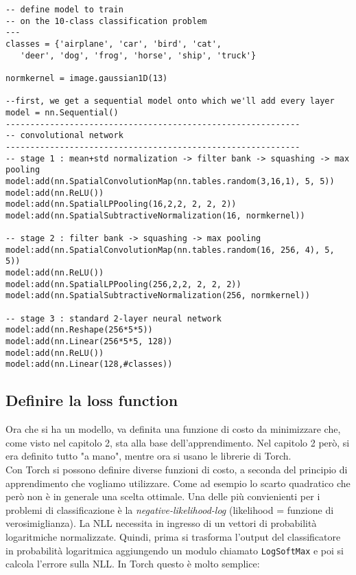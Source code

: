 \begin{lstlisting}[language={[5.2]Lua}]
-- define model to train
-- on the 10-class classification problem
---
classes = {'airplane', 'car', 'bird', 'cat',
   'deer', 'dog', 'frog', 'horse', 'ship', 'truck'}

normkernel = image.gaussian1D(13)

--first, we get a sequential model onto which we'll add every layer
model = nn.Sequential()
------------------------------------------------------------
-- convolutional network
------------------------------------------------------------
-- stage 1 : mean+std normalization -> filter bank -> squashing -> max pooling
model:add(nn.SpatialConvolutionMap(nn.tables.random(3,16,1), 5, 5))
model:add(nn.ReLU())
model:add(nn.SpatialLPPooling(16,2,2, 2, 2, 2))
model:add(nn.SpatialSubtractiveNormalization(16, normkernel))

-- stage 2 : filter bank -> squashing -> max pooling
model:add(nn.SpatialConvolutionMap(nn.tables.random(16, 256, 4), 5, 5))
model:add(nn.ReLU())
model:add(nn.SpatialLPPooling(256,2,2, 2, 2, 2))
model:add(nn.SpatialSubtractiveNormalization(256, normkernel))

-- stage 3 : standard 2-layer neural network
model:add(nn.Reshape(256*5*5))
model:add(nn.Linear(256*5*5, 128))
model:add(nn.ReLU())
model:add(nn.Linear(128,#classes))
\end{lstlisting}

\subsection{Definire la loss function}
Ora che si ha un modello, va definita una funzione di costo da minimizzare che, come visto nel capitolo 2, sta alla base dell’apprendimento. Nel capitolo 2 però, si era definito tutto "a mano", mentre ora si usano le librerie di Torch. \\Con Torch si possono definire diverse funzioni di costo, a seconda del principio di apprendimento che vogliamo utilizzare. Come ad esempio lo scarto quadratico che però non è in generale una scelta ottimale. Una delle più convienienti per i problemi di classificazione è la \emph{negative-likelihood-log} (likelihood = funzione di verosimiglianza). La NLL necessita in ingresso di un vettori di probabilità logaritmiche normalizzate. Quindi, prima si trasforma l’output del classificatore in probabilità logaritmica aggiungendo un modulo chiamato \texttt{LogSoftMax} e poi si calcola l'errore sulla NLL. In Torch questo è molto semplice: 

